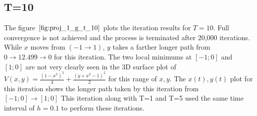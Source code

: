 \documentclass[twoside,12pt]{article}
\begin{document}
\subsection{T=10}
{
The figure $\eqref{fig:proj_1_g_t_10}$ plots the iteration results for $T=10$. Full convergence is not achieved and the process is terminated after 20,000 iterations. While $x$ moves from $(-1 \to 1)$, $y$ takes a farther longer path from $0 \to 12.499 \to 0$ for this iteration. The two local minimums at $[-1;0]$ and $[1;0]$ are not very clearly seen in the 3D surface plot of $V(x,y) =  \frac{(1-x^2)^2}{4} + \frac{(y+x^2-1)^2}{2}$ for this range of $x,y$. The $x(t),y(t)$ plot for this iteration shows the longer path taken by this iteration from $[-1;0] \to [1;0]$ This iteration along with T=1 and T=5 used the same time interval of $h=0.1$ to perform these iterations.
\begin{figure}[htbp!]
     \begin{center}
            \hspace*{-1.4in}           
                    \\%
\end{center}
\end{figure}}
\end{document}
